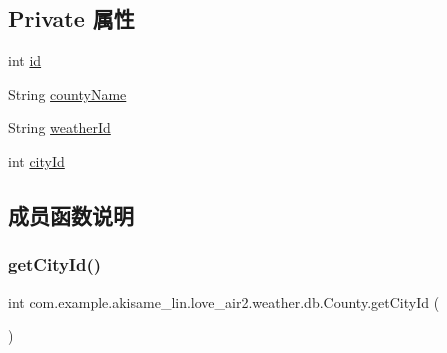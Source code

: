 \subsection*{Private 属性}
\begin{DoxyCompactItemize}
\item 
int \mbox{\hyperlink{classcom_1_1example_1_1akisame__lin_1_1love__air2_1_1weather_1_1db_1_1_county_a56ac4d6f64b542565100e138681c62d6}{id}}
\item 
String \mbox{\hyperlink{classcom_1_1example_1_1akisame__lin_1_1love__air2_1_1weather_1_1db_1_1_county_abaca763825c2bc3d2c3302918902db9b}{county\+Name}}
\item 
String \mbox{\hyperlink{classcom_1_1example_1_1akisame__lin_1_1love__air2_1_1weather_1_1db_1_1_county_a11751ad0f8a6a16364a9ec74a3b7d926}{weather\+Id}}
\item 
int \mbox{\hyperlink{classcom_1_1example_1_1akisame__lin_1_1love__air2_1_1weather_1_1db_1_1_county_ac8ba6886b8502d48b483673a6cd8805c}{city\+Id}}
\end{DoxyCompactItemize}


\subsection{成员函数说明}
\mbox{\label{classcom_1_1example_1_1akisame__lin_1_1love__air2_1_1weather_1_1db_1_1_county_a6d74cfab6bc1e2b55d58b5f37b6b2903}} 
\subsubsection{\texorpdfstring{getCityId()}{getCityId()}}
{\footnotesize\ttfamily int com.\+example.\+akisame\+\_\+lin.\+love\+\_\+air2.\+weather.\+db.\+County.\+get\+City\+Id (\begin{DoxyParamCaption}{ }\end{DoxyParamCaption})\hspace{0.3cm}{\ttfamily [inline]}}

\mbox{\label{classcom_1_1example_1_1akisame__lin_1_1love__air2_1_1weather_1_1db_1_1_county_a6032aca0f273294dabfb63aa0c3ae18b}} 
